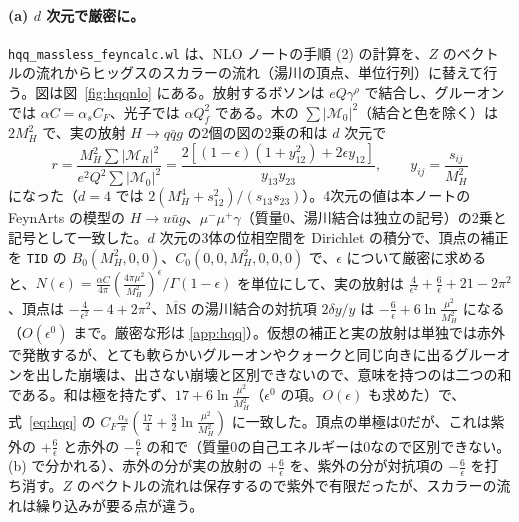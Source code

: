 \documentclass[a4paper,10pt]{ltjsarticle}
\newcommand{\MSbar}{\overline{\mathrm{MS}}}
\begin{document}
\paragraph{(a) $d$ 次元で厳密に。}\texttt{hqq\_massless\_feyncalc.wl} は、NLO ノートの手順 (2) の計算を、$Z$ のベクトルの流れからヒッグスのスカラーの流れ（湯川の頂点、単位行列）に替えて行う。図は図~\ref{fig:hqqnlo} にある。放射するボソンは $eQ\gamma^\rho$ で結合し、グルーオンでは $\alpha C=\alpha_sC_F$、光子では $\alpha Q_f^2$ である。木の $\sum|\mathcal M_0|^2$（結合と色を除く）は $2M_H^2$ で、実の放射 $H\to q\bar qg$ の2個の図の2乗の和は $d$ 次元で
\begin{equation}
r=\frac{M_H^2\sum|\mathcal M_R|^2}{e^2Q^2\sum|\mathcal M_0|^2}=\frac{2[(1-\epsilon)(1+y_{12}^2)+2\epsilon y_{12}]}{y_{13}y_{23}},\qquad y_{ij}=\frac{s_{ij}}{M_H^2}
\label{eq:hqqr}
\end{equation}
になった（$d=4$ では $2(M_H^4+s_{12}^2)/(s_{13}s_{23})$）。4次元の値は本ノートの FeynArts の模型の $H\to u\bar ug$、$\mu^-\mu^+\gamma$（質量0、湯川結合は独立の記号）の2乗と記号として一致した。$d$ 次元の3体の位相空間を Dirichlet の積分で、頂点の補正を \texttt{TID} の $B_0(M_H^2,0,0)$、$C_0(0,0,M_H^2,0,0,0)$ で、$\epsilon$ について厳密に求めると、$N(\epsilon)=\frac{\alpha C}{4\pi}(\frac{4\pi\mu^2}{M_H^2})^\epsilon/\Gamma(1-\epsilon)$ を単位にして、実の放射は $\frac4{\epsilon^2}+\frac6\epsilon+21-2\pi^2$、頂点は $-\frac4{\epsilon^2}-4+2\pi^2$、$\MSbar$ の湯川結合の対抗項 $2\delta y/y$ は $-\frac6\epsilon+6\ln\frac{\mu^2}{M_H^2}$ になる（$O(\epsilon^0)$ まで。厳密な形は \ref{app:hqq}）。仮想の補正と実の放射は単独では赤外で発散するが、とても軟らかいグルーオンやクォークと同じ向きに出るグルーオンを出した崩壊は、出さない崩壊と区別できないので、意味を持つのは二つの和である。和は極を持たず、$17+6\ln\frac{\mu^2}{M_H^2}$（$\epsilon^0$ の項。$O(\epsilon)$ も求めた）で、式~\eqref{eq:hqq} の $C_F\frac{\alpha_s}\pi(\frac{17}4+\frac32\ln\frac{\mu^2}{M_H^2})$ に一致した。頂点の単極は0だが、これは紫外の $+\frac6\epsilon$ と赤外の $-\frac6\epsilon$ の和で（質量0の自己エネルギーは0なので区別できない。(b) で分かれる）、赤外の分が実の放射の $+\frac6\epsilon$ を、紫外の分が対抗項の $-\frac6\epsilon$ を打ち消す。$Z$ のベクトルの流れは保存するので紫外で有限だったが、スカラーの流れは繰り込みが要る点が違う。
\end{document}
